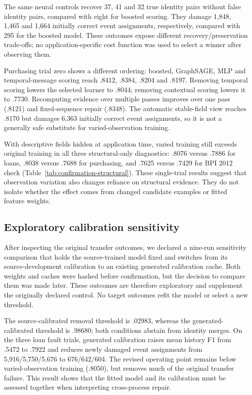\documentclass[11pt]{article}
\begin{document}
The same neural controls recover 37, 41 and 32 true identity pairs without false identity pairs, compared with eight for boosted scoring. They damage 1,848, 1,465 and 1,664 initially correct event assignments, respectively, compared with 295 for the boosted model. These outcomes expose different recovery/preservation trade-offs; no application-specific cost function was used to select a winner after observing them.

Purchasing trial zero shows a different ordering: boosted, GraphSAGE, MLP and temporal-message scoring reach .8412, .8384, .8204 and .8197. Removing temporal scoring lowers the selected learner to .8044; removing contextual scoring lowers it to .7730. Recomputing evidence over multiple passes improves over one pass (.8121) and fixed-sequence repair (.8348). The automatic stable-field view reaches .8170 but damages 6,363 initially correct event assignments, so it is not a generally safe substitute for varied-observation training.

With descriptive fields hidden at application time, varied training still exceeds original training in all three structural-only diagnostics: .8076 versus .7886 for loans, .8038 versus .7688 for purchasing, and .7625 versus .7429 for BPI 2012 check (Table~\ref{tab:confirmation-structural}). These single-trial results suggest that observation variation also changes reliance on structural evidence. They do not isolate whether the effect comes from changed candidate examples or fitted feature weights.

\subsection{Exploratory calibration sensitivity}
After inspecting the original transfer outcomes, we declared a nine-run sensitivity comparison that holds the source-trained model fixed and switches from its source-development calibration to an existing generated calibration cache. Both weights and caches were hashed before confirmation, but the decision to compare them was made later. These outcomes are therefore exploratory and supplement the originally declared control. No target outcomes refit the model or select a new threshold.

The source-calibrated removal threshold is .02983, whereas the generated-calibrated threshold is .98680; both conditions abstain from identity merges. On the three loan fault trials, generated calibration raises mean history F1 from .5472 to .7922 and reduces newly damaged event assignments from 5,916/5,750/5,676 to 676/642/604. The revised operating point remains below varied-observation training (.8050), but removes much of the original transfer failure. This result shows that the fitted model and its calibration must be assessed together when interpreting cross-process repair.
\end{document}

